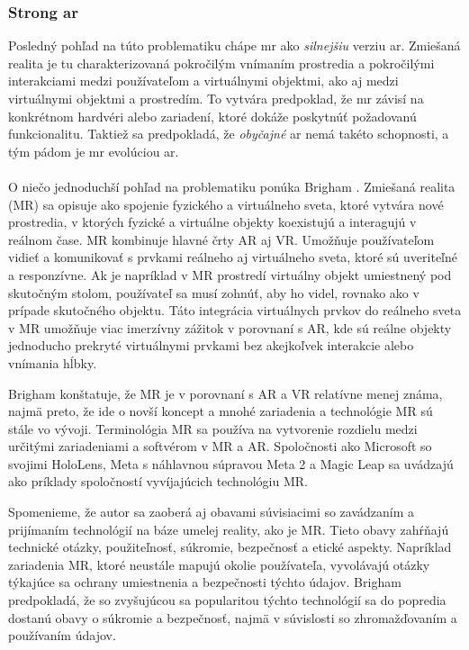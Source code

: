\subsubsection{Strong \acrshort{ar}}
Posledný pohľad na túto problematiku chápe \acrshort{mr} ako \emph{silnejšiu} verziu \acrshort{ar}. Zmiešaná realita je tu charakterizovaná pokročilým vnímaním prostredia
a pokročilými interakciami medzi používateľom a virtuálnymi objektmi, ako aj medzi virtuálnymi objektmi a prostredím. To vytvára predpoklad, že \acrshort{mr} závisí
na konkrétnom hardvéri alebo zariadení, ktoré dokáže poskytnúť požadovanú funkcionalitu. Taktiež sa predpokladá, že \emph{obyčajné} \acrshort{ar} nemá takéto schopnosti,
a tým pádom je \acrshort{mr} evolúciou \acrshort{ar}. \\\\
\noindent
O niečo jednoduchší pohľad na problematiku ponúka Brigham \cite{brighamRealityCheckBasics2017}. Zmiešaná realita (MR) sa opisuje ako spojenie fyzického a virtuálneho sveta, ktoré 
vytvára nové prostredia, v ktorých fyzické a virtuálne objekty koexistujú a interagujú v reálnom čase. MR kombinuje hlavné črty AR aj VR. Umožňuje používateľom vidieť a komunikovať s 
prvkami reálneho aj virtuálneho sveta, ktoré sú uveriteľné a responzívne. Ak je napríklad v MR prostredí virtuálny objekt umiestnený pod skutočným stolom, 
používateľ sa musí zohnúť, aby ho videl, rovnako ako v prípade skutočného objektu. Táto integrácia virtuálnych prvkov do reálneho sveta v MR umožňuje viac imerzívny zážitok v porovnaní 
s AR, kde sú reálne objekty jednoducho prekryté virtuálnymi prvkami bez akejkoľvek interakcie alebo vnímania hĺbky.

Brigham konštatuje, že MR je v porovnaní s AR a VR relatívne menej známa, najmä preto, že ide o novší koncept a mnohé zariadenia a technológie MR sú stále vo vývoji. Terminológia MR sa 
používa na vytvorenie rozdielu medzi určitými zariadeniami a softvérom v MR a AR. Spoločnosti ako Microsoft so svojimi HoloLens, Meta s náhlavnou súpravou Meta 2 a Magic Leap sa uvádzajú ako 
príklady spoločností vyvíjajúcich technológiu MR.

Spomenieme, že autor sa zaoberá aj obavami súvisiacimi so zavádzaním a prijímaním technológií na báze umelej reality, ako je MR. Tieto obavy zahŕňajú technické otázky, použiteľnosť, 
súkromie, bezpečnosť a etické aspekty. Napríklad zariadenia MR, ktoré neustále mapujú okolie používateľa, vyvolávajú otázky týkajúce sa ochrany umiestnenia a bezpečnosti týchto údajov. 
Brigham predpokladá, že so zvyšujúcou sa popularitou týchto technológií sa do popredia dostanú obavy o súkromie a bezpečnosť, najmä v súvislosti so zhromažďovaním a používaním údajov.

